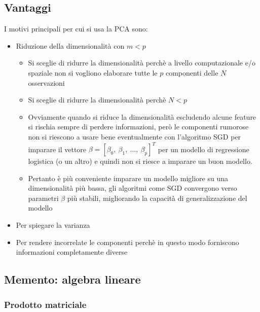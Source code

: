 \subsection{Vantaggi}
	I motivi principali per cui si usa la PCA sono:
	\begin{itemize}[noitemsep, topsep=3pt]
	  \item Riduzione della dimensionalità con $m<p$
	  \begin{itemize}[noitemsep, topsep=3pt]
		  \item Si sceglie di ridurre la dimensionalità perchè a livello computazionale e/o spaziale non si vogliono elaborare tutte le $p$ componenti delle $N$ osservazioni
		  \item Si sceglie di ridurre la dimensionalità perchè $N< p$
		  \item Ovviamente quando si riduce la dimensionalità escludendo alcune feature si rischia sempre di perdere informazioni, però le componenti rumorose non si riescono a usare bene eventualmente con l’algoritmo SGD per imparare il vettore $\beta=[\beta_0,\ \beta_1,\ \dots,\ \beta_p]^T$ per un modello di regressione logistica (o un altro) e quindi non si riesce a imparare un buon modello.
		  \item Pertanto è più conveniente imparare un modello migliore su una dimensionalità più bassa, gli algoritmi come SGD convergono verso parametri $\beta$ più stabili, migliorando la capacità di generalizzazione del modello
		\end{itemize}
	  \item Per spiegare la varianza
	  \item Per rendere incorrelate le componenti perchè in questo modo forniscono informazioni completamente diverse
	\end{itemize}





\subsection{Memento: algebra lineare}
	\subsubsection{Prodotto matriciale}
	
